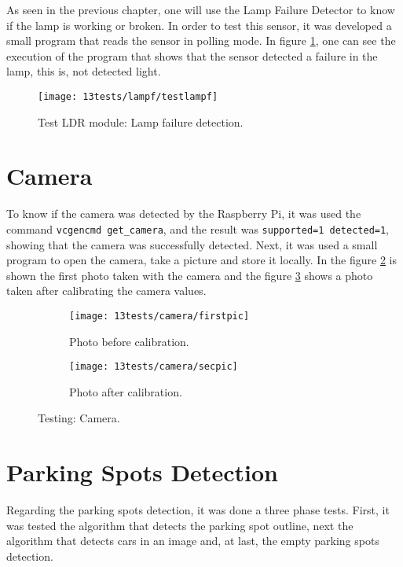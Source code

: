 As seen in the previous chapter, one will use the Lamp Failure Detector to know if the lamp is working or broken. In order to test this sensor, it was developed a small program that reads the sensor in polling mode. In figure \ref{fig:testlampf}, one can see the execution of the program that shows that the sensor detected a failure in the lamp, this is, not detected light.

\begin{figure}[H]
	\centering	
	\texttt{[image: 13tests/lampf/testlampf]}
	\caption{Test LDR module: Lamp failure detection.}
	\label{fig:testlampf}
\end{figure}

\section{Camera}

To know if the camera was detected by the Raspberry Pi, it was used the command \verb|vcgencmd get_camera|, and the result was \verb|supported=1 detected=1|, showing that the camera was successfully detected. Next, it was used a small program to open the camera, take a picture and store it locally. In the figure \ref{fig:firstpic} is shown the first photo taken with the camera and the figure \ref{fig:secpic} shows a photo taken after calibrating the camera values.

\begin{figure}[H]
	\centering
	\begin{subfigure}{.4\textwidth}
		\centering
		\texttt{[image: 13tests/camera/firstpic]}
		\caption{Photo before calibration.}
		\label{fig:firstpic}
	\end{subfigure}%
	\begin{subfigure}{.4\textwidth}
		\centering
		\texttt{[image: 13tests/camera/secpic]}
		\caption{Photo after calibration.}
		\label{fig:secpic}
	\end{subfigure}
	\caption{Testing: Camera.}
	\label{fig:pics}
\end{figure}

\section{Parking Spots Detection}

Regarding the parking spots detection, it was done a three phase tests. First, it was tested the algorithm that detects the parking spot outline, next the algorithm that detects cars in an image and, at last, the empty parking spots detection.

